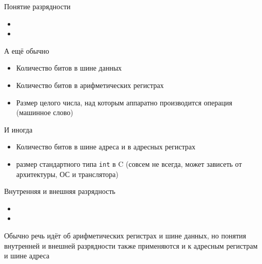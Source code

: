 \documentclass[xetex,aspectratio=43]{beamer}
\begin{document}
\begin{frame}{Понятие разрядности}

\begin{itemize}
    \item
    \item
\end{itemize}

\pause

\begin{block}{А ещё обычно}
    \begin{itemize}
        \tightlist
        \item
        Количество битов в шине данных
        \item
        Количество битов в арифметических регистрах
        \item
        Размер целого числа, над которым аппаратно производится операция
        (машинное слово)
    \end{itemize}
\end{block}

\pause

\begin{block}{И иногда}
    \begin{itemize}
        \tightlist
        \item
        Количество битов в шине адреса и в адресных регистрах
        \item размер стандартного типа
        \texttt{int} в C (совсем не всегда, может зависеть от архитектуры, ОС и транслятора)
    \end{itemize}
\end{block}

\end{frame}

\begin{frame}{Внутренняя и внешняя разрядность}
\begin{itemize}
    \item
    \item
\end{itemize}

Обычно речь идёт об арифметических регистрах и шине данных, но понятия внутренней и внешней разрядности также применяются и к адресным регистрам и шине адреса

\end{frame}
\end{document}
